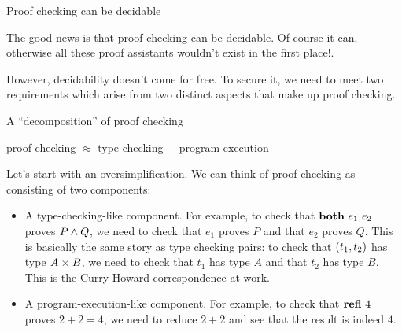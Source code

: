 \documentclass{beamer}
\begin{document}
\begin{frame}{Proof checking can be decidable}

The good news is that proof checking can be decidable. Of course it can, otherwise all these proof assistants wouldn't exist in the first place!.

\vspace{2em}

However, decidability doesn't come for free. To secure it, we need to meet two requirements which arise from two distinct aspects that make up proof checking.

\end{frame}

\begin{frame}{A ``decomposition'' of proof checking}

\begin{center}
  proof checking $\approx$ type checking $+$ program execution
\end{center}

\vspace{1em}

Let's start with an oversimplification. We can think of proof checking as consisting of two components:

\begin{itemize}
  \item A type-checking-like component. For example, to check that $\textbf{both}\ e_1\ e_2$ proves $P \land Q$, we need to check that $e_1$ proves $P$ and that $e_2$ proves $Q$. This is basically the same story as type checking pairs: to check that $(t_1, t_2)$ has type $A \times B$, we need to check that $t_1$ has type $A$ and that $t_2$ has type $B$. This is the Curry-Howard correspondence at work.
  \item A program-execution-like component. For example, to check that $\refl[4]$ proves $2 + 2 = 4$, we need to reduce $2 + 2$ and see that the result is indeed $4$.
\end{itemize}

\end{frame}
\end{document}
